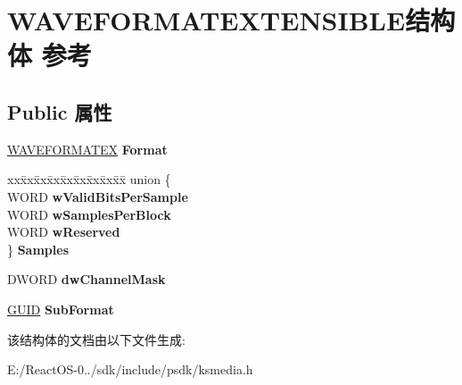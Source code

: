 \hypertarget{struct_w_a_v_e_f_o_r_m_a_t_e_x_t_e_n_s_i_b_l_e}{}\section{W\+A\+V\+E\+F\+O\+R\+M\+A\+T\+E\+X\+T\+E\+N\+S\+I\+B\+L\+E结构体 参考}
\label{struct_w_a_v_e_f_o_r_m_a_t_e_x_t_e_n_s_i_b_l_e}
\subsection*{Public 属性}
\begin{DoxyCompactItemize}
\item 
\mbox{\label{struct_w_a_v_e_f_o_r_m_a_t_e_x_t_e_n_s_i_b_l_e_a290c33511a0262454d4490ec11288313}} 
\hyperlink{struct_w_a_v_e_f_o_r_m_a_t_e_x}{W\+A\+V\+E\+F\+O\+R\+M\+A\+T\+EX} {\bfseries Format}
\item 
\mbox{\label{struct_w_a_v_e_f_o_r_m_a_t_e_x_t_e_n_s_i_b_l_e_aeaaccc1f2393f6c96e79970c78f49a11}} 
\begin{tabbing}
xx\=xx\=xx\=xx\=xx\=xx\=xx\=xx\=xx\=\kill
union \{\\
\>WORD {\bfseries wValidBitsPerSample}\\
\>WORD {\bfseries wSamplesPerBlock}\\
\>WORD {\bfseries wReserved}\\
\} {\bfseries Samples}\\

\end{tabbing}\item 
\mbox{\label{struct_w_a_v_e_f_o_r_m_a_t_e_x_t_e_n_s_i_b_l_e_acb1ee3de0fb2996710e1c79269bf2726}} 
D\+W\+O\+RD {\bfseries dw\+Channel\+Mask}
\item 
\mbox{\label{struct_w_a_v_e_f_o_r_m_a_t_e_x_t_e_n_s_i_b_l_e_af664cacb8a5ae77655d8c6149e86ac6d}} 
\hyperlink{interface_g_u_i_d}{G\+U\+ID} {\bfseries Sub\+Format}
\end{DoxyCompactItemize}


该结构体的文档由以下文件生成\+:\begin{DoxyCompactItemize}
\item 
E\+:/\+React\+O\+S-\/0../sdk/include/psdk/ksmedia.\+h\end{DoxyCompactItemize}
